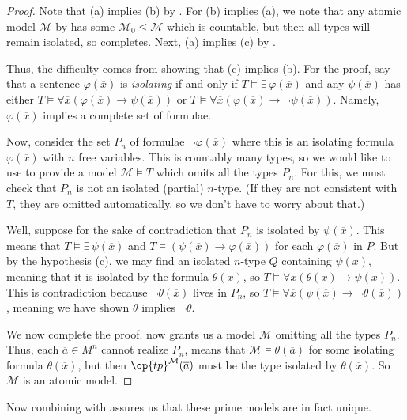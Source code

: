 \documentclass[../notes.tex]{subfiles}
\begin{document}
\begin{proof}
	Note that (a) implies (b) by . For (b) implies (a), we note that any atomic model $\mathcal M$ by  has some $\mathcal M_0\le\mathcal M$ which is countable, but then all types will remain isolated, so  completes. Next, (a) implies (c) by .

	Thus, the difficulty comes from showing that (c) implies (b). For the proof, say that a sentence $\varphi(\overline x)$ is \textit{isolating} if and only if $T\models\exists\,\varphi(\overline x)$ and any $\psi(\overline x)$ has either $T\models\forall\overline x(\varphi(\overline x)\to\psi(\overline x))$ or $T\models\forall\overline x(\varphi(\overline x)\to\lnot\psi(\overline x))$. Namely, $\varphi(\overline x)$ implies a complete set of formulae.

	Now, consider the set $P_n$ of formulae $\lnot\varphi(\overline x)$ where this is an isolating formula $\varphi(\overline x)$ with $n$ free variables. This is countably many types, so we would like to use  to provide a model $\mathcal M\models T$ which omits all the types $P_n$. For this, we must check that $P_n$ is not an isolated (partial) $n$-type. (If they are not consistent with $T$, they are omitted automatically, so we don't have to worry about that.)
	
	Well, suppose for the sake of contradiction that $P_n$ is isolated by $\psi(\overline x)$. This means that $T\models\exists\,\psi(\overline x)$ and $T\models(\psi(\overline x)\to\varphi(\overline x))$ for each $\varphi(\overline x)$ in $P$. But by the hypothesis (c), we may find an isolated $n$-type $Q$ containing $\psi(\overline x)$, meaning that it is isolated by the formula $\theta(\overline x)$, so $T\models\forall\overline x(\theta(\overline x)\to\psi(\overline x))$. This is contradiction because $\lnot\theta(\overline x)$ lives in $P_n$, so $T\models\forall\overline x(\psi(\overline x)\to\lnot\theta(\overline x))$, meaning we have shown $\theta$ implies $\lnot\theta$.

	We now complete the proof.  now grants us a model $\mathcal M$ omitting all the types $P_n$. Thus, each $\overline a\in M^n$ cannot realize $P_n$, means that $\mathcal M\models\theta(\overline a)$ for some isolating formula $\theta(\overline x)$, but then $\op{tp}^{\mathcal M}(\overline a)$ must be the type isolated by $\theta(\overline x)$. So $\mathcal M$ is an atomic model.
\end{proof}
\begin{remark}
	Now combining with  assures us that these prime models are in fact unique.
\end{remark}
\end{document}
